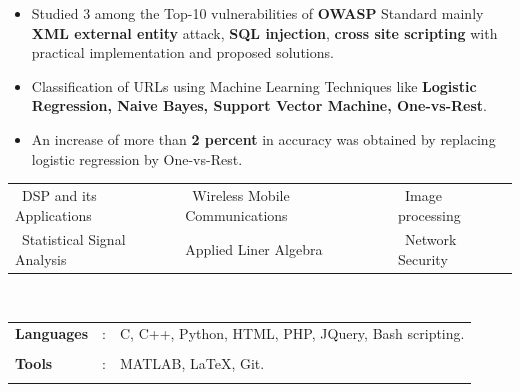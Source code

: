 \documentclass[10pt]{article}
\newcommand\hs{1.3mm}		%
\begin{document}
\begin{itemize}[leftmargin=0.4cm]
	\begin{itemize}
	\item Studied 3 among the Top-10 vulnerabilities of \textbf{OWASP} Standard mainly \textbf{XML external entity} attack, \textbf{SQL injection}, \textbf{cross site scripting} with practical implementation and proposed solutions.
	\item Classification of URLs using Machine Learning Techniques like \textbf{Logistic Regression, Naive Bayes, Support Vector Machine, One-vs-Rest}.
	\item An increase of more than \textbf{2 percent} in accuracy was obtained by replacing logistic regression by One-vs-Rest.
    \end{itemize}

	


\end{itemize}
\hspace{-0.17cm}\colorbox{bl}{}%
	 	
		\begin{tabular}{m{2.3in}m{2.3in}m{2.5in}}
		\hspace{0.55cm}\textbullet\ DSP and its Applications &  \textbullet\ Wireless Mobile Communications  & \textbullet\ Image processing \\
		\hspace{0.55cm}\textbullet\ Statistical Signal Analysis & \textbullet Applied Liner Algebra & \textbullet\ Network Security \\
	\end{tabular}
	
	
	
	
\colorbox{bl}{}\\
\begin{tabular}{m{1in}m{0.20in}m{4.5in}}
	\\[-3mm]
	\hspace{\hs} \hspace{0.12cm}\textbf{\textbf{Languages}} &: & {{C, C++, Python, HTML, PHP, JQuery, Bash scripting.}}\\
	\\[-3.5mm]
	\hspace{\hs} \hspace{0.12cm}\textbf{\textbf{Tools}} &: & {MATLAB, \LaTeX, Git.}\\
	\\[-4mm]
\end{tabular}\\
\end{document}
